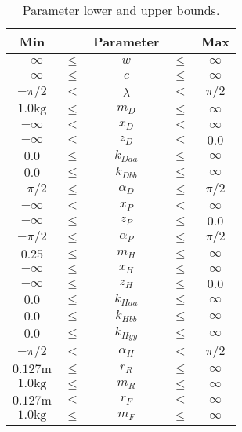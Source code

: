 \documentclass{bmd2019p}
\begin{document}
\begin{table}
  \caption{Parameter lower and upper bounds.}
  \label{tab:bounds}
  \centering
  \begin{tabular}{ccccc}
    \toprule
    Min & & Parameter & & Max\\
    \midrule
    $-\infty$ & $\leq$ & $w       $  &  $\leq$  &  $\infty$ \\
    $-\infty$ & $\leq$ & $c       $  &  $\leq$  &  $\infty$ \\
    $-\pi/2 $ & $\leq$ & $\lambda $  &  $\leq$  &  $\pi/2$ \\
    $1.0\si{\kilogram}$ & $\leq$ & $m_D     $  &  $\leq$  &  $\infty$ \\
    $-\infty$ & $\leq$ & $x_D     $  &  $\leq$  &  $\infty$ \\
    $-\infty$ & $\leq$ & $z_D     $  &  $\leq$  &  $0.0$    \\
    $0.0    $ & $\leq$ & $k_{Daa} $  &  $\leq$  &  $\infty$ \\
    $0.0    $ & $\leq$ & $k_{Dbb} $  &  $\leq$  &  $\infty$ \\
    $-\pi/2 $ & $\leq$ & $\alpha_D$  &  $\leq$  &  $\pi/2$  \\
    $-\infty$ & $\leq$ & $x_P     $  &  $\leq$  &  $\infty$ \\
    $-\infty$ & $\leq$ & $z_P     $  &  $\leq$  &  $0.0$    \\
    $-\pi/2 $ & $\leq$ & $\alpha_P$  &  $\leq$  &  $\pi/2$ \\
    $0.25   $ & $\leq$ & $m_H     $  &  $\leq$  &  $\infty$ \\
    $-\infty$ & $\leq$ & $x_H     $  &  $\leq$  &  $\infty$ \\
    $-\infty$ & $\leq$ & $z_H     $  &  $\leq$  &  $0.0$ \\
    $0.0    $ & $\leq$ & $k_{Haa} $  &  $\leq$  &  $\infty$ \\
    $0.0    $ & $\leq$ & $k_{Hbb} $  &  $\leq$  &  $\infty$ \\
    $0.0    $ & $\leq$ & $k_{Hyy} $  &  $\leq$  &  $\infty$ \\
    $-\pi/2 $ & $\leq$ & $\alpha_H$  &  $\leq$  &  $\pi/2$ \\
    $0.127\si{\meter}$ & $\leq$ & $r_R     $  &  $\leq$  &  $\infty$ \\
    $1.0\si{\kilogram}$ & $\leq$ & $m_R     $  &  $\leq$  &  $\infty$ \\
    $0.127\si{\meter}$ & $\leq$ & $r_F     $  &  $\leq$  &  $\infty$ \\
    $1.0\si{\kilogram}$ & $\leq$ & $m_F     $  &  $\leq$  &  $\infty$ \\
    \bottomrule
  \end{tabular}
\end{table}
\end{document}
